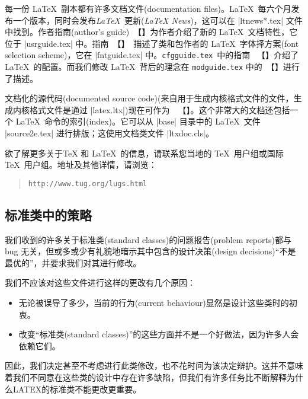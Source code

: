 \documentclass{ltxguide}[1995/11/28]
\newcommand{\heiti}{\CJKfamily{heiti}} %
\newcommand{\kaiti}{\CJKfamily{kaiti}} %
\begin{document}
每一份 \LaTeX{}\ 副本都有许多文档文件(documentation files)。\LaTeX{}\ 每六个月发布一个版本，同时会发布{\emph{\LaTeX{}}}\ {\kaiti 更新}(\emph{\LaTeX{} News})，这可以在 |ltnews*.tex| 文件中找到。作者指南(author's guide)\ {\color{blue}{\emph{\usrguide}}}【{\color{blue}{《\LaTeXe\ 作者指南》}}】为作者介绍了新的 \LaTeX{}\ 文档特性，它位于 |usrguide.tex| 中。指南\ {\color{blue}{\emph{\fntguide}}}【{\color{blue}{《\LaTeXe\ 的字体选择》}}】\ 描述了类和包作者的 \LaTeX{}\ 字体择方案(font selection scheme)，它在 |fntguide.tex| 中。\texttt{cfgguide.tex}\ 中的指南\ {\color{blue} {\emph{\cfgguide}}}【{\color{blue}{《\LaTeXe\ 的配置选项指南》}}】介绍了 \LaTeX{}\ 的配置。而我们修改 \LaTeX{}\ 背后的理念在 \texttt{modguide.tex} 中的\ {\color{blue}{\emph{\modguide}}}【{}】进行了描述。

文档化的源代码(documented source code)(来自用于生成内核格式文件的文件，生成内核格式文件是通过 |latex.ltx|)现在可作为\ {}\ 【{\color{blue}{《\LaTeXe\ 源代码》}}】。这个非常大的文档还包括一个 \LaTeX{}\ 命令的索引(index)。它可以从 |base| 目录中的 \LaTeX{}\ 文件 |source2e.tex| 进行排版；这使用文档类文件 |ltxdoc.cls|。

欲了解更多关于\TeX{} 和 \LaTeX{}\ 的信息，请联系您当地的 \TeX{}\ 用户组或国际 \TeX{}\ 用户组。地址及其他详情，请浏览：
\begin{quote}\small\label{addrs}
    \texttt{http://www.tug.org/lugs.html}
\end{quote}


\subsection[标准类中的策略]{\heiti 标准类中的策略}

我们收到的许多关于标准类(standard classes)的问题报告(problem reports)都与 bug 无关，但或多或少有礼貌地暗示其中包含的设计决策(design decisions)“不是最优的”，并要求我们对其进行修改。

我们不应该对这些文件进行这样的更改有几个原因：
\begin{itemize}
\item
  无论被误导了多少，当前的行为(current behaviour)显然是设计这些类时的初衷。
\item
  改变“标准类(standard classes)”的这些方面并不是一个好做法，因为许多人会依赖它们。
\end{itemize}

因此，我们决定甚至不考虑进行此类修改，也不花时间为该决定辩护。这并不意味着我们不同意在这些类的设计中存在许多缺陷，但我们有许多任务比不断解释为什么LATEX的标准类不能更改更重要。
\end{document}
